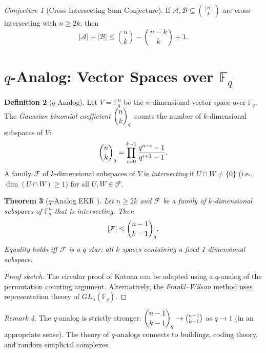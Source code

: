 \documentclass[12pt,a4paper]{amsart}
\newtheorem{theorem}{Theorem}[section]
\theoremstyle{definition}
\newtheorem{definition}[theorem]{Definition}
\theoremstyle{remark}
\newtheorem{remark}[theorem]{Remark}
\newtheorem{conjecture}[theorem]{Conjecture}
\newcommand{\F}{\mathbb{F}}
\begin{document}
\begin{conjecture}[Cross-Intersecting Sum Conjecture]\label{conj:cross_sum}
If $\mathcal{A}, \mathcal{B} \subseteq \binom{[n]}{k}$ are cross-intersecting with
$n \geq 2k$, then
\[
  |\mathcal{A}| + |\mathcal{B}| \leq \binom{n}{k} - \binom{n-k}{k} + 1.
\]
\end{conjecture}

\section{$q$-Analog: Vector Spaces over $\mathbb{F}_q$}\label{sec:q_analog}

\begin{definition}[$q$-Analog]
Let $V = \F_q^n$ be the $n$-dimensional vector space over $\F_q$. The
\emph{Gaussian binomial coefficient} $\dbinom{n}{k}_q$ counts the number of
$k$-dimensional subspaces of $V$:
\[
  \dbinom{n}{k}_q = \prod_{i=0}^{k-1} \frac{q^{n-i} - 1}{q^{i+1} - 1}.
\]
A family $\mathcal{F}$ of $k$-dimensional subspaces of $V$ is \emph{intersecting}
if $U \cap W \neq \{0\}$ (i.e., $\dim(U \cap W) \geq 1$) for all $U, W \in \mathcal{F}$.
\end{definition}

\begin{theorem}[$q$-Analog EKR \cite{FranklWilson1986}]\label{thm:q_ekr}
Let $n \geq 2k$ and $\mathcal{F}$ be a family of $k$-dimensional subspaces of
$\F_q^n$ that is intersecting. Then
\[
  |\mathcal{F}| \leq \dbinom{n-1}{k-1}_q.
\]
Equality holds iff $\mathcal{F}$ is a \emph{$q$-star}: all $k$-spaces containing a
fixed 1-dimensional subspace.
\end{theorem}

\begin{proof}[Proof sketch]
The circular proof of Katona can be adapted using a $q$-analog of the permutation
counting argument. Alternatively, the \emph{Frankl--Wilson} method uses
representation theory of $GL_n(\F_q)$.
\end{proof}

\begin{remark}
The $q$-analog is strictly stronger: $\dbinom{n-1}{k-1}_q \to \binom{n-1}{k-1}$
as $q \to 1$ (in an appropriate sense). The theory of $q$-analogs connects to
buildings, coding theory, and random simplicial complexes.
\end{remark}

\end{document}
